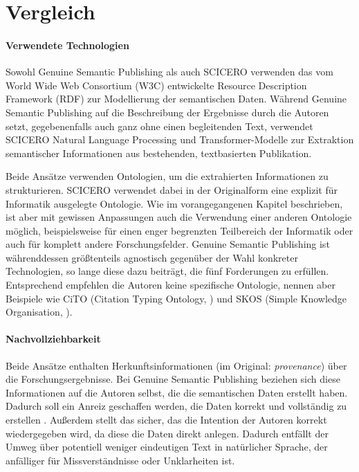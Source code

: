 \section{Vergleich}
\label{sec:vergleich}


\paragraph{Verwendete Technologien}

Sowohl Genuine Semantic Publishing als auch SCICERO verwenden das vom World Wide Web Consortium (W3C) entwickelte Resource Description Framework (RDF) zur Modellierung der semantischen Daten.
Während Genuine Semantic Publishing auf die Beschreibung der Ergebnisse durch die Autoren setzt, gegebenenfalls auch ganz ohne einen begleitenden Text, verwendet SCICERO Natural Language Processing und Transformer-Modelle zur Extraktion semantischer Informationen aus bestehenden, textbasierten Publikation.

Beide Ansätze verwenden Ontologien, um die extrahierten Informationen zu strukturieren.
SCICERO verwendet dabei in der Originalform eine explizit für Informatik ausgelegte Ontologie.
Wie im vorangegangenen Kapitel beschrieben, ist aber mit gewissen Anpassungen auch die Verwendung einer anderen Ontologie möglich, beispielsweise für einen enger begrenzten Teilbereich der Informatik oder auch für komplett andere Forschungsfelder.
Genuine Semantic Publishing ist währenddessen größtenteils agnostisch gegenüber der Wahl konkreter Technologien, so lange diese dazu beiträgt, die fünf Forderungen zu erfüllen.
Entsprechend empfehlen die Autoren keine spezifische Ontologie, nennen aber Beispiele wie CiTO (Citation Typing Ontology, \cite{cito}) und SKOS (Simple Knowledge Organisation, \cite{skos}).

\paragraph{Nachvollziehbarkeit}

Beide Ansätze enthalten Herkunftsinformationen (im Original: \textit{provenance}) über die Forschungsergebnisse.
Bei Genuine Semantic Publishing beziehen sich diese Informationen auf die Autoren selbst, die die semantischen Daten erstellt haben.
Dadurch soll ein Anreiz geschaffen werden, die Daten korrekt und vollständig zu erstellen \cite{kuhn2017genuine}.
Außerdem stellt das sicher, das die Intention der Autoren korrekt wiedergegeben wird, da diese die Daten direkt anlegen.
Dadurch entfällt der Umweg über potentiell weniger eindeutigen Text in natürlicher Sprache, der anfälliger für Missverständnisse oder Unklarheiten ist.

